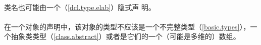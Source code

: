 \paragraph{} %
\begin{note}
  类名也可能由一个（\ref{dcl.type.elab}）隐式声
  明。
\end{note}

\paragraph{} %
在一个对象的声明中，该对象的类型不应该是一个不完整类型（\ref{basic.types}），一
个抽象类类型（\ref{class.abstract}）或者是它们的一个（可能是多维的）数组。
